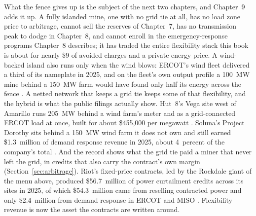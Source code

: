 What the fence gives up is the subject of the next two chapters, and Chapter~9 adds it up. A fully islanded mine, one with no grid tie at all, has no load zone price to arbitrage, cannot sell the reserves of Chapter~7, has no transmission peak to dodge in Chapter~8, and cannot enroll in the emergency-response programs Chapter~8 describes; it has traded the entire flexibility stack this book is about for nearly \$9 of avoided charges and a private energy price. A wind-backed island also runs only when the wind blows: ERCOT's wind fleet delivered a third of its nameplate in 2025, and on the fleet's own output profile a 100~MW mine behind a 150~MW farm would have found only half its energy across the fence \autocite{ercotfuelmix2025,eia860m2026jul}. %
A netted network that keeps a grid tie keeps some of that flexibility, and the hybrid is what the public filings actually show. Hut~8's Vega site west of Amarillo runs 205~MW behind a wind farm's meter and as a grid-connected ERCOT load at once, built for about \$455,000 per megawatt \autocite{hut8_10k2025}. %
Soluna's Project Dorothy sits behind a 150~MW wind farm it does not own and still earned \$1.3~million of demand response revenue in 2025, about 4~percent of the company's total \autocite{soluna10k2025}. %
And the record shows what the grid tie paid a miner that never left the grid, in credits that also carry the contract's own margin (Section~\ref{sec:arbitrage}). Riot's fixed-price contracts, led by the Rockdale giant of the menu above, produced \$56.7~million of power curtailment credits across its sites in 2025, of which \$54.3~million came from reselling contracted power and only \$2.4~million from demand response in ERCOT and MISO \autocite{riot10k2025}. %
Flexibility revenue is now the asset the contracts are written around.


